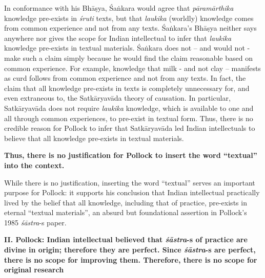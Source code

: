 In conformance with his Bhāṣya, Śaṅkara would agree that {\sl pāramārthika} knowledge pre-exists in {\sl śruti} texts, but that {\sl laukika} (worldly) knowledge comes from common experience and not from any texts. Śaṅ\-kara's Bhāṣya neither says anywhere nor gives the scope for Indian intellectual to infer that {\sl laukika} knowledge pre-exists in textual materials.  Śaṅkara does not -- and would not - make such a claim simply because he would find the claim reasonable based on common experience. For example, knowledge that milk - and not clay -- manifests as curd follows from common experience and not from any texts. In fact, the claim that all knowledge pre-exists in texts is completely unnecessary for, and even extraneous to, the Satkāryavāda theory of causation. In particular, Satkāryavāda does not require {\sl laukika} knowledge, which is available to one and all through common experiences, to pre-exist in textual form. Thus, there is no credible reason for Pollock to infer that Satkāryavāda led Indian intellectuals to believe that all knowledge pre-exists in textual materials.

\textbf{Thus, there is no justification for Pollock to insert the word ``textual'' into the context.}

While there is no justification, inserting the word ``textual'' serves an important purpose for Pollock: it supports his conclusion that Indian intellectual practically lived by the belief that all knowledge, including that of practice, pre-exists in eternal ``textual materials'', an absurd but foundational assertion in Pollock's 1985 {\sl śāstra}-s paper.

\newpage

{\bf II. Pollock: Indian intellectual believed that {{\sl\bfseries śāstra}\relax}-s of practice are divine in origin; therefore they are perfect. Since {{\sl\bfseries śāstra}\relax}-s are perfect, there is no scope for improving them. Therefore, there is no scope for original research}

